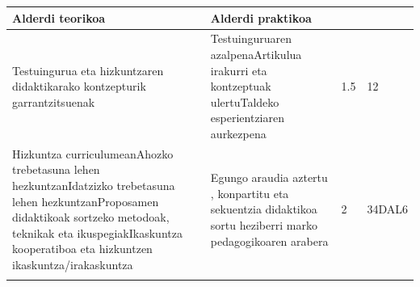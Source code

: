 \documentclass[]{book}
\begin{document}
\begin{longtable}[]{@{}llll@{}}
\toprule
\begin{minipage}[b]{0.36\columnwidth}\raggedright
Alderdi teorikoa\strut
\end{minipage} & \begin{minipage}[b]{0.36\columnwidth}\raggedright
Alderdi praktikoa\strut
\end{minipage} & \begin{minipage}[b]{0.02\columnwidth}\raggedright
\strut
\end{minipage} & \begin{minipage}[b]{0.14\columnwidth}\raggedright
\strut
\end{minipage}\tabularnewline
\midrule
\endhead
\begin{minipage}[t]{0.36\columnwidth}\raggedright
Testuingurua eta hizkuntzaren didaktikarako kontzepturik garrantzitsuenak\strut
\end{minipage} & \begin{minipage}[t]{0.36\columnwidth}\raggedright
Testuinguruaren azalpenaArtikulua irakurri eta kontzeptuak ulertuTaldeko esperientziaren aurkezpena\strut
\end{minipage} & \begin{minipage}[t]{0.02\columnwidth}\raggedright
1.5\strut
\end{minipage} & \begin{minipage}[t]{0.14\columnwidth}\raggedright
12\strut
\end{minipage}\tabularnewline
\begin{minipage}[t]{0.36\columnwidth}\raggedright
Hizkuntza curriculumeanAhozko trebetasuna lehen hezkuntzanIdatzizko trebetasuna lehen hezkuntzanProposamen didaktikoak sortzeko metodoak, teknikak eta ikuspegiakIkaskuntza kooperatiboa eta hizkuntzen ikaskuntza/irakaskuntza\strut
\end{minipage} & \begin{minipage}[t]{0.36\columnwidth}\raggedright
Egungo araudia aztertu , konpartitu eta sekuentzia didaktikoa sortu heziberri marko pedagogikoaren arabera\strut
\end{minipage} & \begin{minipage}[t]{0.02\columnwidth}\raggedright
2\strut
\end{minipage} & \begin{minipage}[t]{0.14\columnwidth}\raggedright
34DAL6\strut
\end{minipage}\tabularnewline
\begin{minipage}[t]{0.36\columnwidth}\raggedright

\end{minipage}
\end{longtable}
\end{document}

